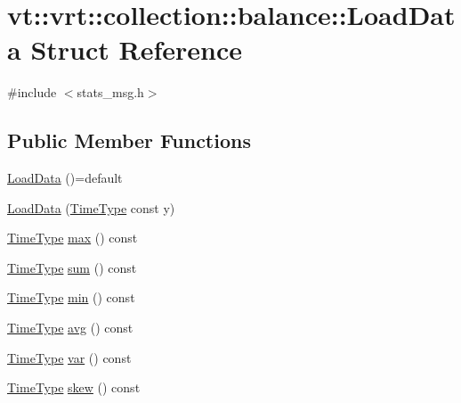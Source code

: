 \hypertarget{structvt_1_1vrt_1_1collection_1_1balance_1_1_load_data}{}\section{vt\+:\+:vrt\+:\+:collection\+:\+:balance\+:\+:Load\+Data Struct Reference}
\label{structvt_1_1vrt_1_1collection_1_1balance_1_1_load_data}


{\ttfamily \#include $<$stats\+\_\+msg.\+h$>$}

\subsection*{Public Member Functions}
\begin{DoxyCompactItemize}
\item 
\hyperlink{structvt_1_1vrt_1_1collection_1_1balance_1_1_load_data_afc2d1f780b2a168ec80f0cf28c830847}{Load\+Data} ()=default
\item 
\hyperlink{structvt_1_1vrt_1_1collection_1_1balance_1_1_load_data_ab15ccb21a9dd47492da6af32ca57cc5a}{Load\+Data} (\hyperlink{namespacevt_a876a9d0cd5a952859c72de8a46881442}{Time\+Type} const y)
\item 
\hyperlink{namespacevt_a876a9d0cd5a952859c72de8a46881442}{Time\+Type} \hyperlink{structvt_1_1vrt_1_1collection_1_1balance_1_1_load_data_a5b1b307477ac122e6df08f28ecf6bb71}{max} () const
\item 
\hyperlink{namespacevt_a876a9d0cd5a952859c72de8a46881442}{Time\+Type} \hyperlink{structvt_1_1vrt_1_1collection_1_1balance_1_1_load_data_a1c941d76f28ff10dd78a55553f9b58ce}{sum} () const
\item 
\hyperlink{namespacevt_a876a9d0cd5a952859c72de8a46881442}{Time\+Type} \hyperlink{structvt_1_1vrt_1_1collection_1_1balance_1_1_load_data_a3a4fc0cb3206cb552e83ef1caa8975eb}{min} () const
\item 
\hyperlink{namespacevt_a876a9d0cd5a952859c72de8a46881442}{Time\+Type} \hyperlink{structvt_1_1vrt_1_1collection_1_1balance_1_1_load_data_ac486f8036d3af52bc5879170ff221046}{avg} () const
\item 
\hyperlink{namespacevt_a876a9d0cd5a952859c72de8a46881442}{Time\+Type} \hyperlink{structvt_1_1vrt_1_1collection_1_1balance_1_1_load_data_ad3008ba8640803abb1a22b37c4224781}{var} () const
\item 
\hyperlink{namespacevt_a876a9d0cd5a952859c72de8a46881442}{Time\+Type} \hyperlink{structvt_1_1vrt_1_1collection_1_1balance_1_1_load_data_a4b32171c4432454889ad11e611e6e705}{skew} () const

\end{DoxyCompactItemize}
